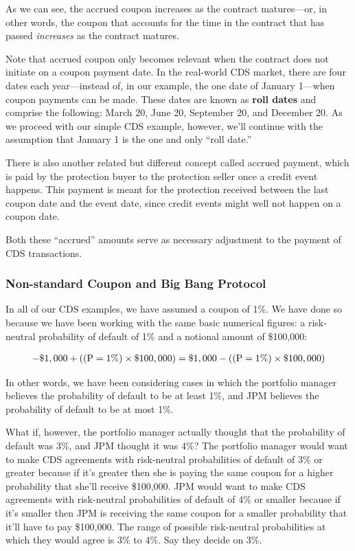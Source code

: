 \documentclass{jss}
\begin{document}
As we can see, the accrued coupon increases as the contract matures---or, in other words, the coupon that accounts for the time in the contract that has passed \emph{increases} as the contract matures.

Note that accrued coupon only becomes relevant when the contract does not initiate on a coupon payment date. In the real-world CDS market, there are four dates each year---instead of, in our example, the one date of January 1---when coupon payments can be made. These dates are known as \textbf{roll dates} and comprise the following: March 20, June 20, September 20, and December 20. As we proceed with our simple CDS example, however, we'll continue with the assumption that January 1 is the one and only ``roll date.''  

There is also another related but different concept called accrued payment, which is paid by the protection buyer to the protection seller once a credit event happens. This payment is meant for the protection received between the last coupon date and the event date, since credit events might well not happen on a coupon date.

Both these ``accrued'' amounts serve as necessary adjustment to the payment of CDS transactions.

\subsubsection{Non-standard Coupon and Big Bang Protocol}
\label{sec:nonStandardCoupon}

In all of our CDS examples, we have assumed a coupon of 1\%. We have done so because we have been working with the same basic numerical figures: a risk-neutral probability of default of 1\% and a notional amount of \$100,000:

\begin{equation}
 \begin{aligned}
   {\rm - \$1,000 + ((P = 1\%) \times \$100,000) = \$1,000 - ((P = 1\%) \times \$100,000)}
    \end{aligned}
\end{equation}

In other words, we have been considering cases in which the portfolio manager believes the probability of default to be at least 1\%, and JPM believes the probability of default to be at most 1\%. 

What if, however, the portfolio manager actually thought that the probability of default was 3\%, and JPM thought it was 4\%? The portfolio manager would want to make CDS agreements with risk-neutral probabilities of default of 3\% or greater because if it's greater then she is paying the same coupon for a higher probability that she'll receive \$100,000. JPM would want to make CDS agreements with risk-neutral probabilities of default of 4\% or smaller because if it's smaller then JPM is receiving the same coupon for a smaller probability that it'll have to pay \$100,000. The range of possible risk-neutral probabilities at which they would agree is 3\% to 4\%. Say they decide on 3\%.
\end{document}
